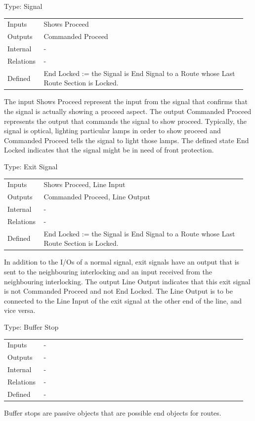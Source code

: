 \documentclass[10pt,a4paper]{article}
\makeatletter
\newcommand{\lab}[1]{\textcolor{Muted}{#1}}
\newenvironment{typerows}
  {\renewcommand{\arraystretch}{1.25}\small
   \begin{tabular}{@{}>{\raggedright\arraybackslash}p{0.14\linewidth}>{\raggedright\arraybackslash}p{0.82\linewidth}@{}}}
  {\end{tabular}}
\makeatother
\begin{document}
\begin{typecard}{Type: Signal}
\begin{typerows}
\lab{Inputs} & Shows Proceed \\
\lab{Outputs} & Commanded Proceed \\
\lab{Internal} & - \\
\lab{Relations} & - \\
\lab{Defined} & End Locked := the Signal is End Signal to a Route whose Last Route Section is Locked. \\
\end{typerows}
\end{typecard}
The input Shows Proceed represent the input from the signal that confirms that the signal is actually showing a proceed aspect. The output Commanded Proceed represents the output that commands the signal to show proceed. Typically, the signal is optical, lighting particular lamps in order to show proceed and Commanded Proceed tells the signal to light those lamps. The defined state End Locked indicates that the signal might be in need of front protection.

\begin{typecard}{Type: Exit Signal}
\begin{typerows}
\lab{Inputs} & Shows Proceed, Line Input \\
\lab{Outputs} & Commanded Proceed, Line Output \\
\lab{Internal} & - \\
\lab{Relations} & - \\
\lab{Defined} & End Locked := the Signal is End Signal to a Route whose Last Route Section is Locked. \\
\end{typerows}
\end{typecard}
In addition to the I/Os of a normal signal, exit signals have an output that is sent to the neighbouring interlocking and an input received from the neighbouring interlocking. The output Line Output indicates that this exit signal is not Commanded Proceed and not End Locked. The Line Output is to be connected to the Line Input of the exit signal at the other end of the line, and vice versa.

\begin{typecard}{Type: Buffer Stop}
\begin{typerows}
\lab{Inputs} & - \\
\lab{Outputs} & - \\
\lab{Internal} & - \\
\lab{Relations} & - \\
\lab{Defined} & - \\
\end{typerows}
\end{typecard}
Buffer stops are passive objects that are possible end objects for routes.
\end{document}
